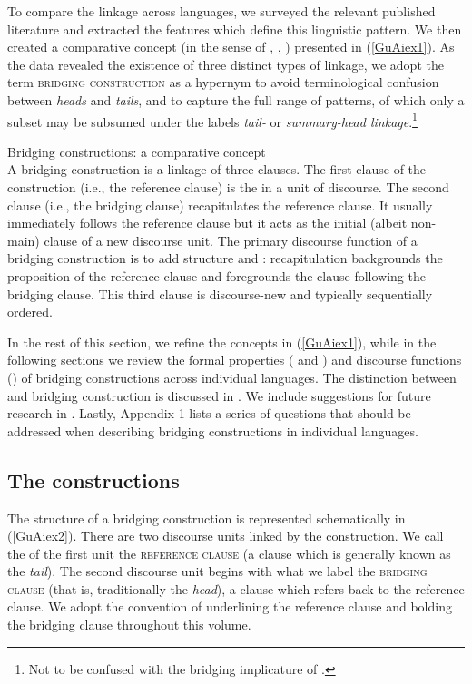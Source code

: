 \documentclass[output=paper]{LSP/langsci}
\begin{document}
To compare the linkage across languages, we surveyed the relevant published literature and extracted the features which define this linguistic pattern. We then created a comparative concept (in the sense of \citealt{haspelmath10}, \citealt{haspelmath16}, \citealt{croft.2016}) presented in (\ref{GuAiex1}). As the data revealed the existence of three distinct types of linkage, we adopt the term \textsc{bridging construction} as a hypernym to avoid terminological confusion between \textit{heads} and \textit{tails}, and to capture the full range of patterns, of which only a subset may be subsumed under the labels \textit{tail-} or \textit{summary-head linkage}.\footnote{Not to be confused with the bridging implicature of \citet{clark75}.} 

\begin{exe}
\ex	\label{GuAiex1}
\glt Bridging constructions: a comparative concept\\
\glt A bridging construction is a linkage of three clauses. The first clause of the construction (i.e., the reference clause) is the  in a unit of discourse. The second clause (i.e., the bridging clause) recapitulates the reference clause. It usually immediately follows the reference clause but it acts as the initial (albeit non-main) clause of a new discourse unit. The primary discourse function of a bridging construction is to add structure and : recapitulation backgrounds the proposition of the reference clause and foregrounds the clause following the bridging clause. This third clause is discourse-new and typically sequentially ordered.
\end{exe}
 
In the rest of this section, we refine the concepts in (\ref{GuAiex1}), while in the following sections we review the formal properties ( and ) and discourse functions () of bridging constructions across individual languages. The distinction between  and bridging construction is discussed in . We include suggestions for future research in . Lastly, Appendix 1 lists a series of questions that should be addressed when describing bridging constructions in individual languages. 

\subsection{The constructions}
\label{GuAi1.1construction}
The structure of a bridging construction is represented schematically in (\ref{GuAiex2}). There are two discourse units linked by the construction. We call the  of the first unit the \textsc{reference clause} (a clause which is generally known as the \textit{tail}). The second discourse unit begins with what we label the \textsc{bridging clause} (that is, traditionally the \textit{head}), a clause which refers back to the reference clause. We adopt the convention of underlining the reference clause and bolding the bridging clause throughout this volume. 
\end{document}
